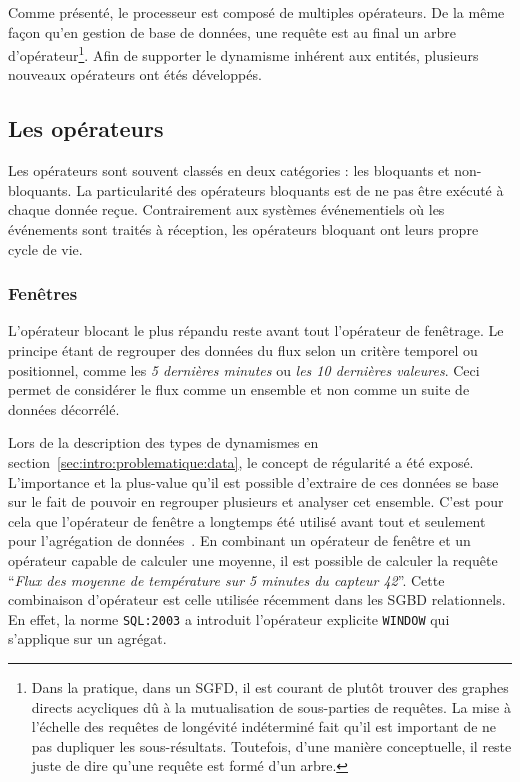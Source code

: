 Comme présenté, le processeur est composé de multiples opérateurs. De la même façon qu'en gestion de base de données, une requête est au final un arbre d'opérateur\footnote{Dans la pratique, dans un SGFD, il est courant de plutôt trouver des graphes directs acycliques dû à la mutualisation de sous-parties de requêtes. La mise à l'échelle des requêtes de longévité indéterminé fait qu'il est important de ne pas dupliquer les sous-résultats. Toutefois, d'une manière conceptuelle, il reste juste de dire qu'une requête est formé d'un arbre.}.
Afin de supporter le dynamisme inhérent aux entités, plusieurs nouveaux opérateurs ont étés développés.

\subsection{Les opérateurs}
Les opérateurs sont souvent classés en deux catégories : les bloquants et non-bloquants. La particularité des opérateurs bloquants est de ne pas être exécuté à chaque donnée reçue. Contrairement aux systèmes événementiels où les événements sont traités à réception, les opérateurs bloquant ont leurs propre cycle de vie.
\subsubsection{Fenêtres}
L'opérateur blocant le plus répandu reste avant tout l'opérateur de fenêtrage. Le principe étant de regrouper des données du flux selon un critère temporel ou positionnel, comme les \textit{5 dernières minutes} ou \textit{les 10 dernières valeures}. Ceci permet de considérer le flux comme un ensemble et non comme un suite de données décorrélé.

Lors de la description des types de dynamismes en section~\ref{sec:intro:problematique:data}, le concept de régularité a été exposé. L'importance et la plus-value qu'il est possible d'extraire de ces données se base sur le fait de pouvoir en regrouper plusieurs et analyser cet ensemble. C'est pour cela que l'opérateur de fenêtre a longtemps été utilisé avant tout et seulement pour l'agrégation de données~\cite{Madden:tag, Abadi:aurora}. En combinant un opérateur de fenêtre et un opérateur capable de calculer une moyenne, il est possible de calculer la requête \enquote{\it Flux des moyenne de température sur 5 minutes du capteur 42}. Cette combinaison d'opérateur est celle utilisée récemment dans les SGBD relationnels. En effet, la norme \verb|SQL:2003| a introduit l'opérateur explicite \verb|WINDOW| qui s'applique sur un agrégat.


